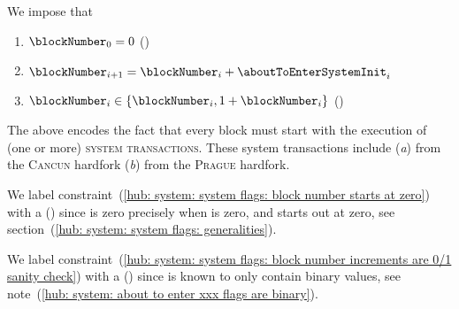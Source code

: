 We impose that
\begin{enumerate}
	\item \label{hub: system: system flags: block number starts at zero} $\blockNumber _{0} = 0$ (\sanityCheck)
	\item $\blockNumber _{i + 1} = \blockNumber _{i} + \aboutToEnterSystemInit _{i}$
	\item \label{hub: system: system flags: block number increments are 0/1 sanity check} $\blockNumber _{i} \in \{ \blockNumber _{i}, 1 + \blockNumber _{i} \}$ (\sanityCheck)
\end{enumerate}
\saNote{} \label{hub: system: system flags: block number increments and initial system transactions}
The above encodes the fact that every block must start with the execution of (one or more) \textsc{system transactions}.
These system transactions include
(\emph{a}) \cite{EIP-4788} from the \textsc{Cancun} hardfork
(\emph{b}) \cite{EIP-2935} from the \textsc{Prague} hardfork.

\saNote{}
We label constraint~(\ref {hub: system: system flags: block number starts at zero}) with a (\sanityCheck) since
\blockNumber{} is zero precisely when \flagSum{} is zero, and
\flagSum{} starts out at zero,
see section~(\ref{hub: system: system flags: generalities}).

\saNote{}
We label constraint~(\ref{hub: system: system flags: block number increments are 0/1 sanity check}) with a (\sanityCheck) since
\aboutToEnterSystemInit{} is known to only contain binary values,
see note~(\ref{hub: system: about to enter xxx flags are binary}).
